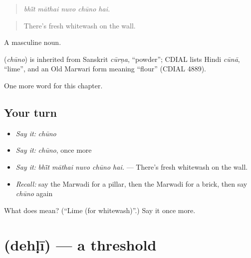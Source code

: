 \begin{quote}
    
\end{quote}

\begin{quote}
\emph{bhī̃t māthai nuvo chūno hai.}
\end{quote}

\begin{quote}
There's fresh whitewash on the wall.
\end{quote}

A masculine noun.

\begin{cousinweb}
\textbf{} (\emph{chūno}) is inherited from Sanskrit \emph{cūrṇa}, \textquotedblleft{}powder\textquotedblright{}; CDIAL lists Hindi \emph{cūnā}, \textquotedblleft{}lime\textquotedblright{}, and an Old Marwari form meaning \textquotedblleft{}flour\textquotedblright{} (CDIAL 4889).
\end{cousinweb}

\begin{grammarlens}[title={What you've built}]
One more word for this chapter.
\end{grammarlens}

\subsection*{Your turn}
\begin{itemize}
\raggedright
  \item \emph{Say it:} \emph{chūno}
  \item \emph{Say it:} \emph{chūno}, once more
  \item \emph{Say it:} \emph{bhī̃t māthai nuvo chūno hai.} — There's fresh whitewash on the wall.
  \item \emph{Recall:} say the Marwadi for a pillar, then the Marwadi for a brick, then say \emph{chūno} again
\end{itemize}

\begin{tcolorbox}[breakable,colback=teal!4,colframe=teal!35!black,title={Before you move on}]
What does  mean? (\textquotedblleft{}Lime (for whitewash)\textquotedblright{}.) Say it once more.
\end{tcolorbox}
\section[\texorpdfstring{\mw{देहळी} (dehḷī)}{देहळी (dehḷī)}]{ (dehḷī) — a threshold}

